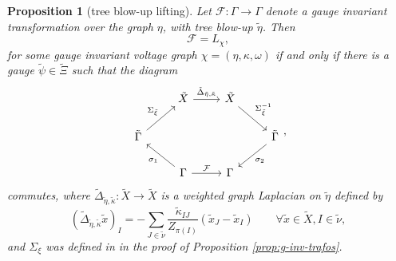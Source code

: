 \documentclass[10pt,reqno]{amsart}
\numberwithin{equation}{section}
\theoremstyle{bfnote}
\newtheorem{proposition}[theorem]{Proposition}
\theoremstyle{bfdef}
\newcommand{\mc}[1]{\mathcal{#1}}
\providecommand\x; %
\renewcommand{\x}{x}
\begin{document}
 
	\begin{proposition}[tree blow-up lifting]\label{prop:blow-up-tree}
		Let $\mc{F}:\Gamma \to \Gamma$ denote a gauge invariant transformation over the graph $\eta$, with tree blow-up $\tilde{\eta}$. Then
		\begin{equation}
			\mc{F} = L_{\chi},
		\end{equation}
		for some gauge invariant voltage graph $\chi = (\eta,\kappa,\omega)$ if and only if there is a gauge $\tilde\psi \in \tilde \Xi$ such that the diagram
		\begin{equation}\label{eq:tree-lift}
			\begin{tikzcd}
				&\tilde X \ar[r,"\tilde{\Delta}_{\tilde\eta,\tilde\kappa}"] &\tilde X \ar[dr,"\Sigma_{\tilde{\xi}}^{-1}"] &\\ 
 				\tilde{\Gamma}\ar[ru,"\Sigma_{\tilde \xi}"] & & & \tilde{\Gamma} \ar[dl,"\sigma_{2}"] \\
				&\Gamma \ar[ul,"\sigma_{1}"] \ar[r,"\mc{F}"] & \Gamma&
			\end{tikzcd},
		\end{equation}
		commutes, where $\tilde{\Delta}_{\tilde\eta,\tilde\kappa} : \tilde X \to \tilde X$ is a weighted graph Laplacian on $\tilde \eta$ defined by 
		\begin{equation}\label{eq:def-delta-td}
			(\tilde{\Delta}_{\tilde\eta,\tilde\kappa}\tilde\x)_{I}
			= -\sum_{J\in \tilde\nu} \frac{\tilde\kappa_{IJ}}{Z_{\pi(I)}} (\tilde\x_{J} - \tilde\x_{I}) \qquad \forall \tilde x \in \tilde X, I \in \tilde \nu,
		\end{equation}
		and $\Sigma_{\xi}$ was defined in in the proof of Proposition \ref{prop:g-inv-trafos}.
	\end{proposition}
\end{document}
